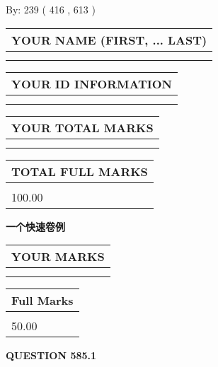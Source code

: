 \documentclass{ctexart}
\begin{document}
   
\hspace{1.0in} By: 
 239 ( 416 ,  613 )
   
   
   
   
\newpage 
\setcounter{page}{ 
   585001 } 
   
   
   
   
\noindent\begin{tabular}{|l|}
\hline
YOUR NAME (FIRST, ... LAST)  \\
\hline
 \\ 
 \\ 
\hline
\end{tabular}
\hspace{0.05in} \begin{tabular}{|l|}
\hline
 YOUR   ID   INFORMATION  \\
\hline
 \\ 
 \\ 
\hline
\end{tabular}
   
   
\vspace{0.2in}\noindent\begin{tabular}{|l|}
\hline
YOUR TOTAL MARKS  \\
\hline
 \\ 
 \\ 
\hline
\end{tabular}
\hspace{0.05in} \begin{tabular}{|l|}
\hline
TOTAL FULL MARKS  \\
\hline
 \\ 
100.00 \\
\hline
\end{tabular}
   
   
 \vspace{0.2in}
{\LARGE {\textbf{ 一个快速卷例}}}
   
   
  
\vspace{0.2in}
  
\noindent\begin{tabular}{|l|}
\hline
 YOUR MARKS  \\
\hline
 \\ 
 \\ 
\hline
\end{tabular}
\hspace{0.05in} \begin{tabular}{|l|}
\hline
 Full Marks  \\
\hline
 \\ 
50.00 \\
\hline
\end{tabular}
{\textbf{\Large{QUESTION
585.1 
}}}
  
\end{document}
